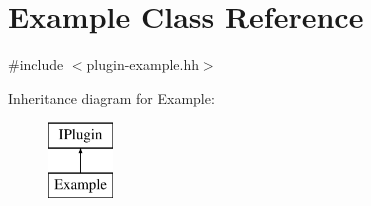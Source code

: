 \hypertarget{classExample}{\section{Example Class Reference}
\label{classExample}
}


{\ttfamily \#include $<$plugin-\/example.\-hh$>$}

Inheritance diagram for Example\-:\begin{figure}[H]
\begin{center}
\leavevmode
\includegraphics[height=2.000000cm]{classExample}
\end{center}
\end{figure}
